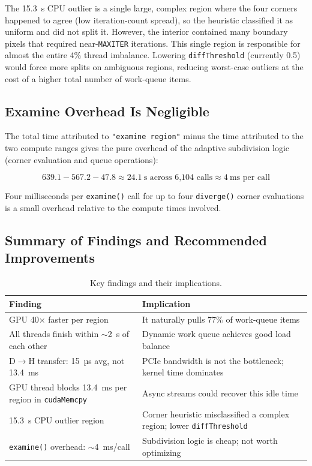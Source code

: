 \documentclass[
	english,
	letterpaper, oneside
]{article}
\begin{document}
The 15.3~s CPU outlier is a single large, complex region where the four
corners happened to agree (low iteration-count spread), so the heuristic
classified it as uniform and did not split it. However, the interior
contained many boundary pixels that required near-\texttt{MAXITER}
iterations. This single region is responsible for almost the entire 4\%
thread imbalance. Lowering \texttt{diffThreshold} (currently 0.5) would
force more splits on ambiguous regions, reducing worst-case outliers at the
cost of a higher total number of work-queue items.

\subsection{Examine Overhead Is Negligible}

The total time attributed to \texttt{"examine region"} minus the time
attributed to the two compute ranges gives the pure overhead of the
adaptive subdivision logic (corner evaluation and queue operations):

\[
    639.1 - 567.2 - 47.8 \approx 24.1~\text{s across 6{,}104 calls}
    \approx 4~\text{ms per call}
\]

Four milliseconds per \texttt{examine()} call for up to four
\texttt{diverge()} corner evaluations is a small overhead relative to the
compute times involved.

\subsection{Summary of Findings and Recommended Improvements}

\begin{table}[H]
    \centering
    \caption{Key findings and their implications.}
    \begin{tabular}{p{5.5cm} p{7cm}}
        \hline
        \textbf{Finding} & \textbf{Implication} \\
        \hline
        GPU 40$\times$ faster per region &
            It naturally pulls 77\% of work-queue items \\
        All threads finish within $\sim$2~s of each other &
            Dynamic work queue achieves good load balance \\
        D$\rightarrow$H transfer: 15~µs avg, not 13.4~ms &
            PCIe bandwidth is not the bottleneck; kernel time dominates \\
        GPU thread blocks 13.4~ms per region in \texttt{cudaMemcpy} &
            Async streams could recover this idle time \\
        15.3~s CPU outlier region &
            Corner heuristic misclassified a complex region; lower \texttt{diffThreshold} \\
        \texttt{examine()} overhead: $\sim$4~ms/call &
            Subdivision logic is cheap; not worth optimizing \\
        \hline
    \end{tabular}
\end{table}
\end{document}

